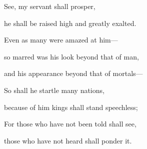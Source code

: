 \lettrine[lines=2]{S}{}ee, my servant shall prosper,\par
   he shall be raised high and greatly exalted.\par
\noindent Even as many were amazed at him—\par
   so marred was his look beyond that of man,\par
   and his appearance beyond that of mortals—\par
\noindent So shall he startle many nations,\par
   because of him kings shall stand speechless;\par
\noindent For those who have not been told shall see,\par
   those who have not heard shall ponder it.
